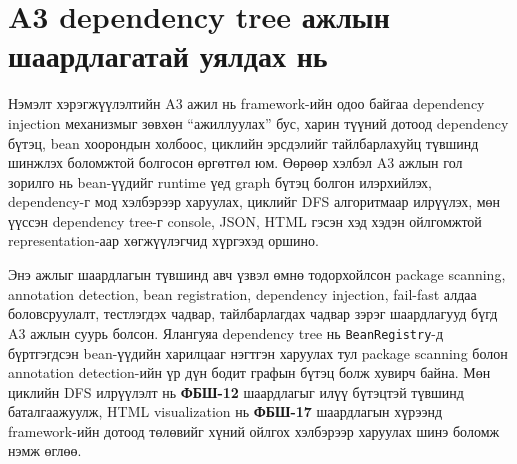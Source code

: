 \section{A3 dependency tree ажлын шаардлагатай уялдах нь}

Нэмэлт хэрэгжүүлэлтийн A3 ажил нь framework-ийн одоо байгаа dependency injection механизмыг зөвхөн ``ажиллуулах'' бус, харин түүний дотоод dependency бүтэц, bean хоорондын холбоос, циклийн эрсдэлийг тайлбарлахуйц түвшинд шинжлэх боломжтой болгосон өргөтгөл юм. Өөрөөр хэлбэл A3 ажлын гол зорилго нь bean-үүдийг runtime үед graph бүтэц болгон илэрхийлэх, dependency-г мод хэлбэрээр харуулах, циклийг DFS алгоритмаар илрүүлэх, мөн үүссэн dependency tree-г console, JSON, HTML гэсэн хэд хэдэн ойлгомжтой representation-аар хөгжүүлэгчид хүргэхэд оршино.

Энэ ажлыг шаардлагын түвшинд авч үзвэл өмнө тодорхойлсон package scanning, annotation detection, bean registration, dependency injection, fail-fast алдаа боловсруулалт, тестлэгдэх чадвар, тайлбарлагдах чадвар зэрэг шаардлагууд бүгд A3 ажлын суурь болсон. Ялангуяа dependency tree нь \texttt{BeanRegistry}-д бүртгэгдсэн bean-үүдийн харилцааг нэгтгэн харуулах тул package scanning болон annotation detection-ийн үр дүн бодит графын бүтэц болж хувирч байна. Мөн циклийн DFS илрүүлэлт нь \textbf{ФБШ-12} шаардлагыг илүү бүтэцтэй түвшинд баталгаажуулж, HTML visualization нь \textbf{ФБШ-17} шаардлагын хүрээнд framework-ийн дотоод төлөвийг хүний ойлгох хэлбэрээр харуулах шинэ боломж нэмж өглөө.


